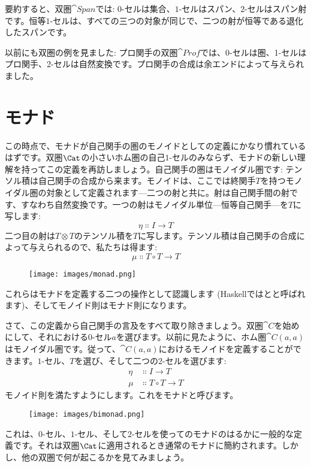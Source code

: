\noindent
要約すると、双圏$\cat{Span}$では: $0$-セルは集合、$1$-セルはスパン、$2$-セルはスパン射です。恒等$1$-セルは、すべての三つの対象が同じで、二つの射が恒等である退化したスパンです。

以前にも双圏の例を見ました: プロ関手の双圏$\cat{Prof}$では、0-セルは圏、1-セルはプロ関手、2-セルは自然変換です。プロ関手の合成は余エンドによって与えられました。

\section{モナド}

この時点で、モナドが自己関手の圏のモノイドとしての定義にかなり慣れているはずです。双圏$\Cat$の小さいホム圏の自己$1$-セルのみならず、モナドの新しい理解を持ってこの定義を再訪しましょう。自己関手の圏はモノイダル圏です: テンソル積は自己関手の合成から来ます。モノイドは、ここでは終関手$T$を持つモノイダル圏の対象として定義されます—二つの射と共に。射は自己関手間の射です、すなわち自然変換です。一つの射はモノイダル単位—恒等自己関手—を$T$に写します: 
\[\eta \Colon I \to T\]
二つ目の射は$T \otimes T$のテンソル積を$T$に写します。テンソル積は自己関手の合成によって与えられるので、私たちは得ます: 
\[\mu \Colon T \circ T \to T\]

\begin{figure}[H]
  \centering
  \texttt{[image: images/monad.png]}
\end{figure}

\noindent
これらはモナドを定義する二つの操作として認識します (Haskellではとと呼ばれます)、そしてモノイド則はモナド則になります。

さて、この定義から自己関手の言及をすべて取り除きましょう。双圏$\cat{C}$を始めにして、それにおける$0$-セル$a$を選びます。以前に見たように、ホム圏$\cat{C}(a, a)$はモノイダル圏です。従って、$\cat{C}(a, a)$におけるモノイドを定義することができます。$1$-セル、$T$を選び、そして二つの$2$-セルを選びます: 
\begin{align*}
  \eta & \Colon I \to T         \\
  \mu  & \Colon T \circ T \to T
\end{align*}
モノイド則を満たすようにします。これをモナドと呼びます。

\begin{figure}[H]
  \centering
  \texttt{[image: images/bimonad.png]}
\end{figure}

\noindent
これは、$0$-セル、$1$-セル、そして$2$-セルを使ってのモナドのはるかに一般的な定義です。それは双圏$\Cat$に適用されるとき通常のモナドに簡約されます。しかし、他の双圏で何が起こるかを見てみましょう。

